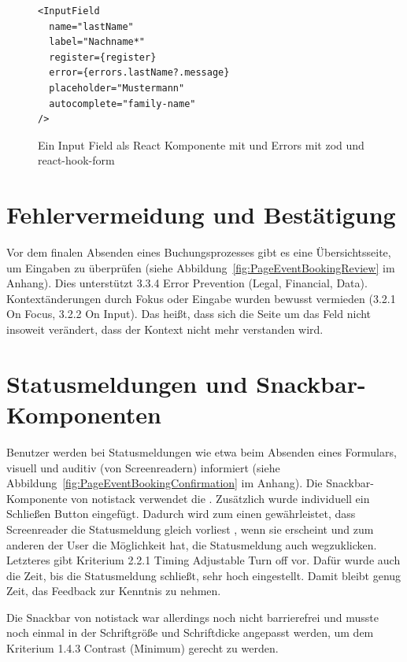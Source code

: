 \begin{figure}[H]
\begin{verbatim}
<InputField
  name="lastName"
  label="Nachname*"
  register={register}
  error={errors.lastName?.message}
  placeholder="Mustermann"
  autocomplete="family-name"
/>
\end{verbatim}
\caption{Ein Input Field als React Komponente mit  und Errors mit zod und react-hook-form}
\end{figure}

\section{Fehlervermeidung und Bestätigung}
Vor dem finalen Absenden eines Buchungsprozesses gibt es eine Übersichtsseite, um Eingaben zu überprüfen (siehe Abbildung~\ref{fig:PageEventBookingReview} im Anhang). Dies unterstützt 3.3.4 Error Prevention (Legal, Financial, Data). Kontextänderungen durch Fokus oder Eingabe wurden bewusst vermieden (3.2.1 On Focus, 3.2.2 On Input). Das heißt, dass sich die Seite um das Feld nicht insoweit verändert, dass der Kontext nicht mehr verstanden wird.

\section{Statusmeldungen und Snackbar-Komponenten}
Benutzer werden bei Statusmeldungen wie etwa beim Absenden eines Formulars, visuell und auditiv (von Screenreadern) informiert (siehe Abbildung~\ref{fig:PageEventBookingConfirmation} im Anhang). Die Snackbar-Komponente von notistack verwendet die . Zusätzlich wurde individuell ein Schließen Button eingefügt. Dadurch wird zum einen gewährleistet, dass Screenreader die Statusmeldung gleich vorliest \parencite[vgl.][]{mdn_role-alert_nodate}, wenn sie erscheint und zum anderen der User die Möglichkeit hat, die Statusmeldung auch wegzuklicken. Letzteres gibt Kriterium 2.2.1 Timing Adjustable Turn off vor. Dafür wurde auch die Zeit, bis die Statusmeldung schließt, sehr hoch eingestellt. Damit bleibt genug Zeit, das Feedback zur Kenntnis zu nehmen.

Die Snackbar von notistack war allerdings noch nicht barrierefrei und musste noch einmal in der Schriftgröße und Schriftdicke angepasst werden, um dem Kriterium 1.4.3 Contrast (Minimum) gerecht zu werden.

